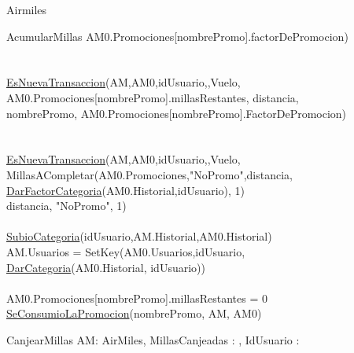 \documentclass[11pt,a4paper]{article}
\newcommand{\Tipo}[1]{\mathsf{#1}}
\begin{document}
\begin{tad}{Airmiles}
\begin{proc}{AcumularMillas}
{		AM0.Promociones[nombrePromo].factorDePromocion) \implica
		\\
		\\
		\\
		\hyperref[sec:EsNuevaTransaccion]{EsNuevaTransaccion}(AM,AM0,idUsuario,\conj{},Vuelo,
		\\
		AM0.Promociones[nombrePromo].millasRestantes, distancia,
		\\ nombrePromo, AM0.Promociones[nombrePromo].FactorDePromocion) \yLuego
		\\
		\\
		\\
		\hyperref[sec:EsNuevaTransaccion]{EsNuevaTransaccion}(AM,AM0,idUsuario,\conj{},Vuelo,
		\\
		MillasACompletar(AM0.Promociones,"NoPromo",distancia,
		\\\hyperref[sec:DarFactorCategoria]{DarFactorCategoria}(AM0.Historial,idUsuario), 1)
		\\distancia, "NoPromo", 1) \yLuego
		\\
		\\
		\hyperref[sec:SubioCategoria]{SubioCategoria}(idUsuario,AM.Historial,AM0.Historial) \implicaLuego
		\\
		AM.Usuarios = SetKey(AM0.Usuarios,idUsuario,
		\\
		\hyperref[sec:DarCategoria]{DarCategoria}(AM0.Historial, idUsuario)) \land
		\\
		\\
		AM0.Promociones[nombrePromo].millasRestantes = 0 \implicaLuego
		\\
		\hyperref[sec:SeConsumioLaPromocion]{SeConsumioLaPromocion}(nombrePromo, AM, AM0)
	}
\end{proc}

\vspace{1cm}
\hypertarget{sec:CanjearMillas}{}\label{sec:CanjearMillas}
\begin{proc}{CanjearMillas}
	{\Inout AM: AirMiles, \In MillasCanjeadas : \Tipo{\R}, \In IdUsuario : \Tipo{\Z}}
	{}
\end{proc}


\end{tad}
\end{document}
